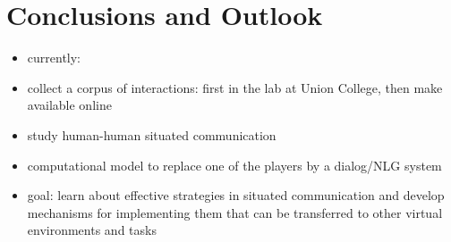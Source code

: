 
\section{Conclusions and Outlook}

\begin{itemize}
\item currently:
\item collect a corpus of interactions: first in the lab at Union
  College, then make available online
\item study human-human situated communication
\item computational model to replace one of the players by a
  dialog/NLG system
\item goal: learn about effective strategies in situated communication
  and develop mechanisms for implementing them that can be transferred
  to other virtual environments and tasks
\end{itemize}
